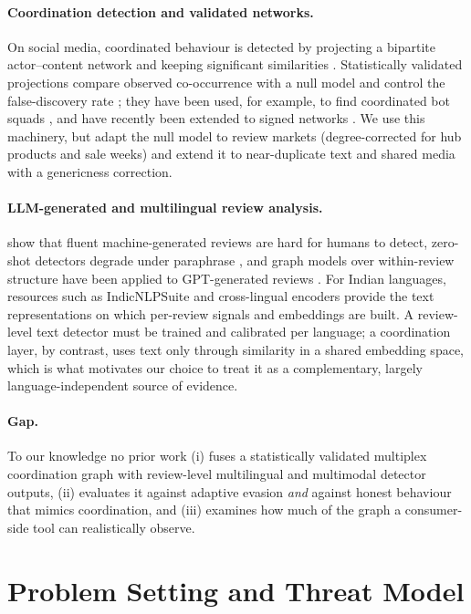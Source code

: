 \documentclass[pdflatex,sn-basic]{sn-jnl}
\theoremstyle{thmstyleone}
\theoremstyle{thmstylethree}
\begin{document}
\paragraph{Coordination detection and validated networks.} On social media, coordinated behaviour is detected by projecting a bipartite actor--content network and keeping significant similarities \citep{pacheco2021}. Statistically validated projections compare observed co-occurrence with a null model and control the false-discovery rate \citep{tumminello2011,benjamini1995}; they have been used, for example, to find coordinated bot squads \citep{caldarelli2020}, and have recently been extended to signed networks \citep{gallo2025}. We use this machinery, but adapt the null model to review markets (degree-corrected for hub products and sale weeks) and extend it to near-duplicate text and shared media with a genericness correction.

\paragraph{LLM-generated and multilingual review analysis.} \citet{salminen2022} show that fluent machine-generated reviews are hard for humans to detect, zero-shot detectors degrade under paraphrase \citep{mitchell2023}, and graph models over within-review structure have been applied to GPT-generated reviews \citep{phukon2025}. For Indian languages, resources such as IndicNLPSuite \citep{kakwani2020} and cross-lingual encoders \citep{conneau2020} provide the text representations on which per-review signals and embeddings are built. A review-level text detector must be trained and calibrated per language; a coordination layer, by contrast, uses text only through similarity in a shared embedding space, which is what motivates our choice to treat it as a complementary, largely language-independent source of evidence.

\paragraph{Gap.} To our knowledge no prior work (i) fuses a statistically validated multiplex coordination graph with review-level multilingual and multimodal detector outputs, (ii) evaluates it against adaptive evasion \emph{and} against honest behaviour that mimics coordination, and (iii) examines how much of the graph a consumer-side tool can realistically observe.

\section{Problem Setting and Threat Model}\label{sec:problem}
\end{document}
